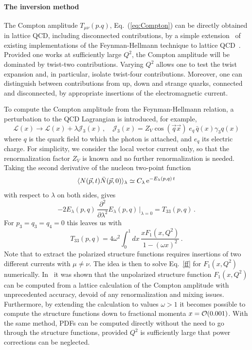 \paragraph*{The inversion method} 
\label{Sec:InversionMethod}

The Compton amplitude $T_{\mu\nu}(p.q)$, Eq.~(\ref{eq:Compton}) can be
directly obtained in lattice QCD, including disconnected contributions,  by a simple extension~\cite{Chambers:2017dov} of existing implementations of the Feynman-Hellmann technique to lattice QCD~\cite{Horsley:2012pz,Chambers:2014qaa,Chambers:2015bka}.
%
Provided one works at sufficiently large $Q^2$, the Compton amplitude will be dominated by twist-two contributions.
%
Varying $Q^2$ allows one to test the twist expansion and, in particular, isolate twist-four contributions. Moreover, one can distinguish between contributions from up, down and strange quarks, connected and disconnected, by appropriate insertions of the electromagnetic current.

To compute the Compton amplitude from the Feynman-Hellmann relation, a perturbation to the QCD Lagrangian is introduced, for example,
\begin{equation}
\mathcal{L}(x) \rightarrow \mathcal{L}(x) + \lambda \mathcal{J}_3(x)\,, \quad \mathcal{J}_3(x)=Z_V\cos(\vec{q}\vec{x})\; e_q \,\bar{q}(x)\gamma_3 q(x) 
\label{in}
\end{equation}
where $q$ is the quark field to which the photon is attached, and $e_q$ its electric charge. For simplicity, we consider the local vector current only, so that the renormalization factor $Z_V$ is known and no further renormalization is needed. Taking the second derivative of the nucleon two-point function 
\begin{equation}
\langle N(\vec{p},t) \bar{N}(\vec{p},0)\rangle_\lambda \simeq C_\lambda\, {\rm e}^{-E_\lambda(p,q)\,t}
\end{equation}
with respect to $\lambda$ on both sides, gives
\begin{equation}
-2 E_\lambda(p,q)\, \frac{\partial^2}{\partial\lambda^2}  E_\lambda(p,q)\,\big|_{\lambda=0} = T_{33}(p,q) \,.
\end{equation}
For $p_3=q_3=q_4=0$ this leaves us with
\begin{equation}
T_{33}(p,q) = 4 \omega^2 \int_0^1 dx\,  \frac{xF_1(x,Q^2)}{1-(\omega x)^2} \,.
\label{ff}
\end{equation}
Note that to extract the polarized structure functions requires insertions of two different currents with $\mu\neq \nu$. The idea is then to solve Eq.~\eqref{ff} for $F_1(x,Q^2)$ numerically.
%
In~\cite{Chambers:2017dov} it was shown that the unpolarized structure function $F_1(x,Q^2)$ can be computed from a lattice calculation of the Compton amplitude with unprecedented accuracy, devoid of any renormalization and mixing issues. Furthermore, by extending the calculation to values $\omega > 1$ it becomes possible
to compute the structure functions down to fractional momenta $x = {\cal O}(0.001)$. With the same method, PDFs can be computed directly without the need to go through the structure functions, provided $Q^2$ is sufficiently large that power corrections can be neglected. 

